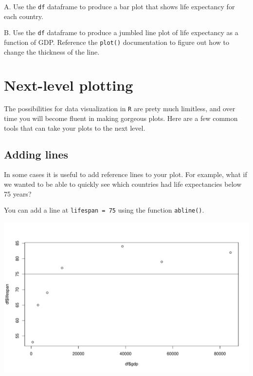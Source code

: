 \documentclass[
]{book}
\newenvironment{Shaded}{\begin{snugshade}}{\end{snugshade}}
\newcommand{\DataTypeTok}[1]{\textcolor[rgb]{0.13,0.29,0.53}{#1}}
\newcommand{\DecValTok}[1]{\textcolor[rgb]{0.00,0.00,0.81}{#1}}
\newcommand{\KeywordTok}[1]{\textcolor[rgb]{0.13,0.29,0.53}{\textbf{#1}}}
\newcommand{\NormalTok}[1]{#1}
\newcommand{\OperatorTok}[1]{\textcolor[rgb]{0.81,0.36,0.00}{\textbf{#1}}}
\newcommand{\StringTok}[1]{\textcolor[rgb]{0.31,0.60,0.02}{#1}}
\begin{document}
A. Use the \texttt{df} dataframe to produce a bar plot that shows life expectancy for each country.

B. Use the \texttt{df} dataframe to produce a jumbled line plot of life expectancy as a function of GDP. Reference the \texttt{plot()} documentation to figure out how to change the thickness of the line.

\hypertarget{next-level-plotting}{%
\section*{Next-level plotting}\label{next-level-plotting}}

The possibilities for data visualization in \texttt{R} are prety much limitless, and over time you will become fluent in making gorgeous plots. Here are a few common tools that can take your plots to the next level.

\hypertarget{adding-lines}{%
\subsection*{Adding lines}\label{adding-lines}}

In some cases it is useful to add reference lines to your plot. For example, what if we wanted to be able to quickly see which countries had life expectancies below 75 years?

You can add a line at \texttt{lifespan\ =\ 75} using the function \texttt{abline()}.

\begin{Shaded}
\end{Shaded}

\includegraphics{figures/unnamed-chunk-103-1.pdf}
\end{document}

